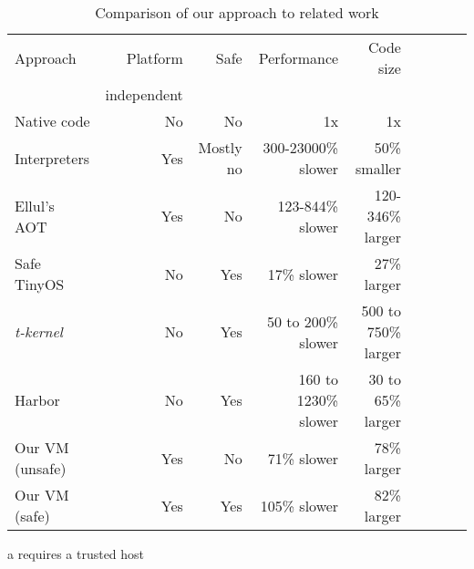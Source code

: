 
\begin{table}[]
\centering
\caption{Comparison of our approach to related work}
\label{tbl-contribution-comparison}
\begin{threeparttable}
\begin{tabular}{lrrrrrrrr}
\toprule
Approach        & Platform    & Safe               & Performance           & Code size              \\
                & independent &                    &                       & \\
\midrule
Native code     & No          & No                 & 1x                    & 1x                     \\
Interpreters    & Yes         & Mostly no          & 300-23000\% slower    & ~50\% smaller          \\
Ellul's AOT     & Yes         & No                 & 123-844\% slower      & 120-346\% larger       \\
Safe TinyOS     & No          & Yes\tnote{a}       & 17\% slower           & 27\% larger            \\
\emph{t-kernel} & No          & Yes                & 50 to 200\% slower    & 500 to 750\% larger    \\
Harbor          & No          & Yes                & 160 to 1230\% slower  & 30 to 65\% larger      \\
Our VM (unsafe) & Yes         & No                 & 71\% slower           & 78\% larger            \\ %
Our VM (safe)   & Yes         & Yes                & 105\% slower          & 82\% larger            \\ %
\bottomrule
\end{tabular}
\begin{tablenotes}
	\item[a] requires a trusted host
\end{tablenotes}
\end{threeparttable}
\end{table}
